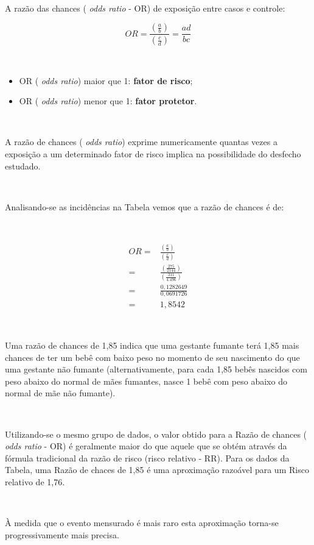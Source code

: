 \documentclass[
]{book}
\providecommand{\tightlist}{%
  \setlength{\itemsep}{0pt}\setlength{\parskip}{0pt}}
\begin{document}
~

A razão das chances ( \emph{odds ratio} - OR) de exposição entre casos e controle:

\hfill\break

\[
OR = \frac{\left(\frac{a}{b}\right)}{\left(\frac{c}{d}\right)} = \frac{ad}{bc}
\]

~

\begin{itemize}
\tightlist
\item
  OR ( \emph{odds ratio}) maior que 1: \textbf{fator de risco};
\item
  OR ( \emph{odds ratio}) menor que 1: \textbf{fator protetor}.
\end{itemize}

~

A razão de chances ( \emph{odds ratio}) exprime numericamente quantas vezes a exposição a um determinado fator de risco implica na possibilidade do desfecho estudado.

~

Analisando-se as incidências na Tabela vemos que a razão de chances é de:

~

\begin{align*}
OR = & \frac{\left(\frac{a}{b}\right)}{\left(\frac{c}{d}\right)} \\
   = & \frac{\left(\frac{275}{2144}\right)}{\left(\frac{311}{4.496}\right)} \\
   = & \frac{0,1282649}{0,0691726} \\
   = & 1,8542
\end{align*}

~

Uma razão de chances de 1,85 indica que uma gestante fumante terá 1,85 mais chances de ter um bebê com baixo peso no momento de seu nascimento do que uma gestante não fumante (alternativamente, para cada 1,85 bebês nascidos com peso abaixo do normal de mães fumantes, nasce 1 bebê com peso abaixo do normal de mãe não fumante).

~

Utilizando-se o mesmo grupo de dados, o valor obtido para a Razão de chances ( \emph{odds ratio} - OR) é geralmente maior do que aquele que se obtém através da fórmula tradicional da razão de risco (risco relativo - RR). Para os dados da Tabela, uma Razão de chaces de 1,85 é uma aproximação razoável para um Risco relativo de 1,76.

~

À medida que o evento mensurado é mais raro esta aproximação torna-se progressivamente mais precisa.
\end{document}
